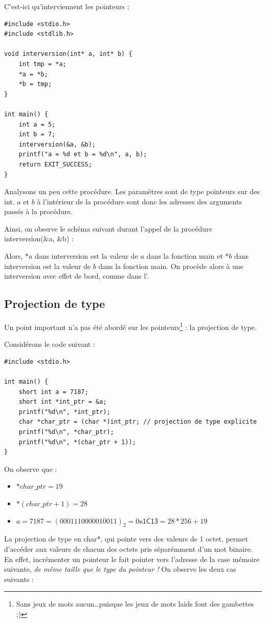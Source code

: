 \documentclass[../../../main.tex]{subfiles}
\begin{document}
C'est-ici qu'interviennent les pointeurs :
\begin{verbatim}
#include <stdio.h>
#include <stdlib.h>

void interversion(int* a, int* b) {
	int tmp = *a;
	*a = *b;
	*b = tmp;
}

int main() {
	int a = 5;
	int b = 7;
	interversion(&a, &b);
	printf("a = %d et b = %d\n", a, b);
	return EXIT_SUCCESS;
}
\end{verbatim}
Analysons un peu cette procédure. Les paramètres sont de type pointeurs sur des \textsf{int}. $a$ et $b$ à l'intérieur de la procédure sont donc les adresses des arguments passés à la procédure.
 
Ainsi, on observe le schéma suivant durant l'appel de la procédure \textsf{interversion(\&a, \&b)} :  

\begin{minipage}{\textwidth}
	\begin{center}
		
	\end{center}
\end{minipage}
 
Alors, $*a$ dans \textsf{interversion} est la valeur de $a$ dans la fonction \textsf{main} et $*b$ dans \textsf{interversion} est la valeur de $b$ dans la fonction \textsf{main}. On procède alors à une interversion avec effet de bord, comme dans l'.
 
\subsection{Projection de type}
Un point important n'a pas été abordé sur les pointeurs\footnote{Sans jeux de mots aucun\dots puisque les jeux de mots laids font des gambettes ;)} : la projection de type.
 
Considérons le code suivant :
\begin{verbatim}
#include <stdio.h>

int main() {
	short int a = 7187;
	short int *int_ptr = &a;
	printf("%d\n", *int_ptr);
	char *char_ptr = (char *)int_ptr; // projection de type explicite
	printf("%d\n", *char_ptr);
	printf("%d\n", *(char_ptr + 1));
}
\end{verbatim}
On observe que :
\begin{itemize}
	\item $*char\_ptr = 19$
	\item $*(char\_ptr + 1) = 28$
	\item $a = 7187 = (0001110000010011)_{2} = 0\textsf{x1C13} = 28 * 256 + 19$
\end{itemize}
La projection de type en \textsf{char*}, qui pointe vers des valeurs de 1 octet, permet d'accéder aux valeurs de chacun des octets pris séparémment d'un mot binaire. En effet, incrémenter un pointeur le fait pointer vers l'adresse de la case mémoire suivante, \textit{de même taille que le type du pointeur !} On observe les deux cas suivants : 
\end{document}
